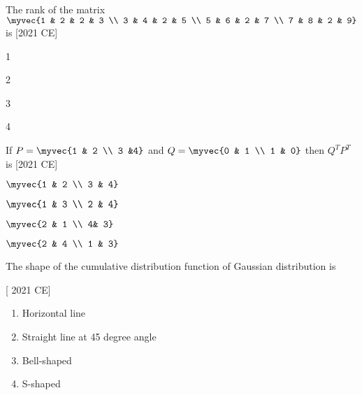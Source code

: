 \item The rank of the matrix $\myvec{1 & 2 & 2 & 3 \\ 3 & 4 & 2 & 5 \\ 5 & 6 & 2 & 7 \\ 7 & 8 & 2 & 9}$ is \hfill [2021 CE]
\begin{enumerate}
    \begin{multicols}{4}
        \item 1
        \item 2
        \item 3
        \item 4
    \end{multicols}
\end{enumerate}
\item If $P = \myvec{1 & 2 \\ 3 &4}$ and $Q = \myvec{0 & 1 \\ 1 & 0}$ then $Q^TP^T$ is \hfill [2021 CE]
\begin{enumerate}
\begin{multicols}{4}
    \item $\myvec{1 & 2 \\ 3 & 4}$
     \item $\myvec{1 & 3 \\ 2 & 4}$
      \item $\myvec{2 & 1 \\ 4& 3}$
       \item $\myvec{2 & 4 \\ 1 & 3}$
\end{multicols}
\end{enumerate}
\item The shape of the cumulative distribution function of Gaussian distribution is 

\hfill [ 2021 CE]
\begin{enumerate}
    \item Horizontal line
    \item Straight line at 45 degree angle
    \item Bell-shaped
    \item S-shaped
\end{enumerate}

